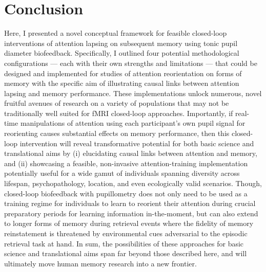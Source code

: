 \section{Conclusion}
Here, I presented a novel conceptual framework for feasible closed-loop interventions of attention lapsing on subsequent memory using tonic pupil diameter biofeedback. Specifically, I outlined four potential methodological configurations --- each with their own strengths and limitations --- that could be designed and implemented for studies of attention reorientation on forms of memory with the specific aim of illustrating causal links between attention lapsing and memory performance. These implementations unlock numerous, novel fruitful avenues of research on a variety of populations that may not be traditionally well suited for fMRI closed-loop approaches. Importantly, if real-time manipulations of attention using each participant's own pupil signal for reorienting causes substantial effects on memory performance, then this closed-loop intervention will reveal transformative potential for both basic science and translational aims by (i) elucidating causal links between attention and memory, and (ii) showcasing a feasible, non-invasive attention-training implementation potentially useful for a wide gamut of individuals spanning diversity across lifespan, psychopathology, location, and even ecologically valid scenarios. Though, closed-loop biofeedback with pupillometry does not only need to be used as a training regime for individuals to learn to reorient their attention during crucial preparatory periods for learning information in-the-moment, but can also extend to longer forms of memory during retrieval events where the fidelity of memory reinstatement is threatened by environmental cues adversarial to the episodic retrieval task at hand. In sum, the possibilities of these approaches for basic science and translational aims span far beyond those described here, and will ultimately move human memory research into a new frontier.